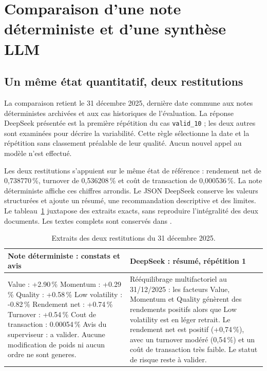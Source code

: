 \section{Comparaison d'une note déterministe et d'une synthèse LLM}
\label{sec:comparaison-notes}

\subsection{Un même état quantitatif, deux restitutions}

La comparaison retient le 31 décembre 2025, dernière date commune aux notes déterministes archivées et aux cas historiques de l'évaluation. La réponse DeepSeek présentée est la première répétition du cas \texttt{valid\_10} ; les deux autres sont examinées pour décrire la variabilité. Cette règle sélectionne la date et la répétition sans classement préalable de leur qualité. Aucun nouvel appel au modèle n'est effectué.

Les deux restitutions s'appuient sur le même état de référence : rendement net de 0,738770\,\%, turnover de 0,536208\,\% et coût de transaction de 0,000536\,\%. La note déterministe affiche ces chiffres arrondis. Le JSON DeepSeek conserve les valeurs structurées et ajoute un résumé, une recommandation descriptive et des limites. Le tableau~\ref{tab:comparaison-extraits} juxtapose des extraits exacts, sans reproduire l'intégralité des deux documents. Les textes complets sont conservés dans .

\begin{table}[H]
\centering
\caption{Extraits des deux restitutions du 31 décembre 2025.}
\label{tab:comparaison-extraits}
\small
\begin{tabular}{@{}p{}p{}@{}}
\toprule
\textbf{Note déterministe : constats et avis} & \textbf{DeepSeek : résumé, répétition 1} \\
\midrule
Value : +2.90\,\%\newline
Momentum : +0.29\,\%\newline
Quality : +0.58\,\%\newline
Low volatility : -0.82\,\%\newline
Rendement net : +0.74\,\%\newline
Turnover : +0.54\,\%\newline
Cout de transaction : 0.00054\,\%\newline\newline
Avis du superviseur : a valider. Aucune modification de poids ni aucun ordre ne sont generes.
& Rééquilibrage multifactoriel au 31/12/2025 : les facteurs Value, Momentum et Quality génèrent des rendements positifs alors que Low volatility est en léger retrait. Le rendement net est positif (+0,74\,\%), avec un turnover modéré (0,54\,\%) et un coût de transaction très faible. Le statut de risque reste à valider. \\
\bottomrule
\end{tabular}
\end{table}

